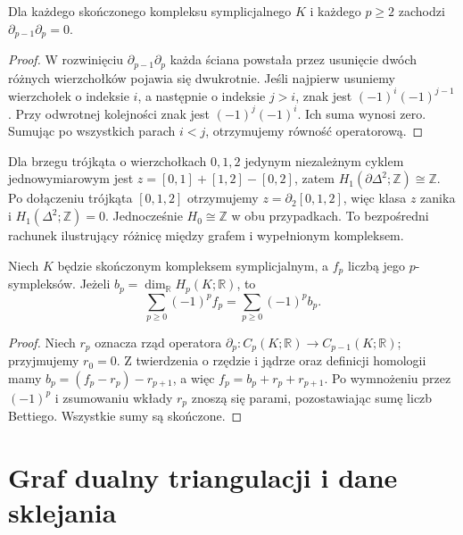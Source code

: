 \begin{stwierdzenie}
Dla każdego skończonego kompleksu symplicjalnego $K$
i każdego $p\ge2$ zachodzi $\partial_{p-1}\partial_p=0$.
\end{stwierdzenie}

\begin{proof}
W rozwinięciu $\partial_{p-1}\partial_p$ każda ściana
powstała przez usunięcie dwóch różnych wierzchołków
pojawia się dwukrotnie. Jeśli najpierw usuniemy wierzchołek
o indeksie $i$, a następnie o indeksie $j>i$, znak jest
$(-1)^i(-1)^{j-1}$. Przy odwrotnej kolejności znak jest
$(-1)^j(-1)^i$. Ich suma wynosi zero. Sumując po wszystkich
parach $i<j$, otrzymujemy równość operatorową.
\end{proof}

\begin{przyklad}
Dla brzegu trójkąta o wierzchołkach $0,1,2$ jedynym
niezależnym cyklem jednowymiarowym jest
$z=[0,1]+[1,2]-[0,2]$, zatem
$H_1(\partial\Delta^2;\mathbb Z)\cong\mathbb Z$.
Po dołączeniu trójkąta $[0,1,2]$ otrzymujemy
$z=\partial_2[0,1,2]$, więc klasa $z$ zanika i
$H_1(\Delta^2;\mathbb Z)=0$. Jednocześnie $H_0\cong\mathbb Z$
w obu przypadkach. To bezpośredni rachunek ilustrujący
różnicę między grafem i wypełnionym kompleksem.
\end{przyklad}

\begin{stwierdzenie}
Niech $K$ będzie skończonym kompleksem symplicjalnym,
a $f_p$ liczbą jego $p$-sympleksów. Jeżeli
$b_p=\dim_{\mathbb R}H_p(K;\mathbb R)$, to
\[
\sum_{p\ge0}(-1)^pf_p=\sum_{p\ge0}(-1)^pb_p.
\]
\end{stwierdzenie}

\begin{proof}
Niech $r_p$ oznacza rząd operatora
$\partial_p:C_p(K;\mathbb R)\to C_{p-1}(K;\mathbb R)$;
przyjmujemy $r_0=0$. Z twierdzenia o rzędzie i jądrze
oraz definicji homologii mamy
$b_p=(f_p-r_p)-r_{p+1}$, a więc
$f_p=b_p+r_p+r_{p+1}$. Po wymnożeniu przez $(-1)^p$
i zsumowaniu wkłady $r_p$ znoszą się parami, pozostawiając
sumę liczb Bettiego. Wszystkie sumy są skończone.
\end{proof}

\section{Graf dualny triangulacji i dane sklejania}
\label{sec:tg-dual-triangulation}

